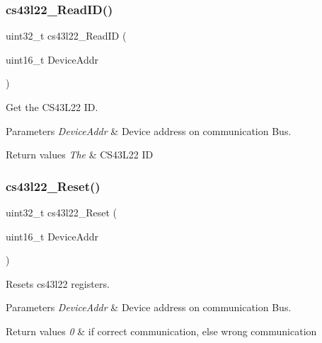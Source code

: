 \subsubsection{\texorpdfstring{cs43l22\+\_\+\+Read\+I\+D()}{cs43l22\_ReadID()}}
{\footnotesize\ttfamily uint32\+\_\+t cs43l22\+\_\+\+Read\+ID (\begin{DoxyParamCaption}\item[{uint16\+\_\+t}]{Device\+Addr }\end{DoxyParamCaption})}



Get the C\+S43\+L22 ID. 


\begin{DoxyParams}{Parameters}
{\em Device\+Addr} & Device address on communication Bus. ~\newline
\\
\hline
\end{DoxyParams}

\begin{DoxyRetVals}{Return values}
{\em The} & C\+S43\+L22 ID \\
\hline
\end{DoxyRetVals}
\mbox{\label{group___c_s43_l22___private___functions_ga647488feb466972a5557a2fe2e9350e7}} 
\subsubsection{\texorpdfstring{cs43l22\+\_\+\+Reset()}{cs43l22\_Reset()}}
{\footnotesize\ttfamily uint32\+\_\+t cs43l22\+\_\+\+Reset (\begin{DoxyParamCaption}\item[{uint16\+\_\+t}]{Device\+Addr }\end{DoxyParamCaption})}



Resets cs43l22 registers. 


\begin{DoxyParams}{Parameters}
{\em Device\+Addr} & Device address on communication Bus. \\
\hline
\end{DoxyParams}

\begin{DoxyRetVals}{Return values}
{\em 0} & if correct communication, else wrong communication \\
\hline
\end{DoxyRetVals}
\mbox{\label{group___c_s43_l22___private___functions_ga579c0ef6455060e9117632f8d83d606a}} 
